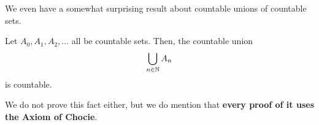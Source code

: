 We even have a somewhat surprising result about countable unions of countable sets.

\begin{boxproposition}
    Let $A_0, A_1, A_2, \ldots$ all be countable sets. Then, the countable union
    \begin{align*}
        \bigcup_{n \in \mathbb{N}} A_n
    \end{align*}
    is countable.
\end{boxproposition}

We do not prove this fact either, but we do mention that \textbf{every proof of it uses the Axiom of Chocie}.

\begin{boxexample}
    
\end{boxexample}



